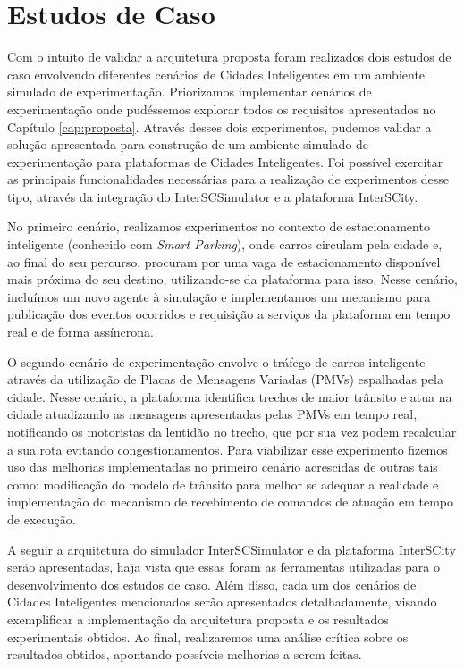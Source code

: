 \chapter{Estudos de Caso}
\label{cap:estudos-de-caso}


Com o intuito de validar a arquitetura proposta foram realizados dois estudos de caso envolvendo diferentes cenários de Cidades Inteligentes em um ambiente simulado de experimentação.
Priorizamos implementar cenários de experimentação onde pudéssemos explorar todos os requisitos apresentados no Capítulo \ref{cap:proposta}.
Através desses dois experimentos, pudemos validar a solução apresentada para construção de um ambiente simulado de experimentação para plataformas de Cidades Inteligentes.
Foi possível exercitar as principais funcionalidades necessárias para a realização de experimentos desse tipo, através da integração do InterSCSimulator e a plataforma InterSCity.

No primeiro cenário, realizamos experimentos no contexto de estacionamento inteligente (conhecido com \textit{Smart Parking}), onde carros circulam pela cidade e, ao
final do seu percurso, procuram por uma vaga de estacionamento disponível mais próxima do seu destino, utilizando-se da plataforma para isso.
Nesse cenário, incluímos um novo agente à simulação e implementamos um mecanismo para publicação dos eventos ocorridos e requisição a serviços da plataforma em tempo real
e de forma assíncrona.

O segundo cenário de experimentação envolve o tráfego de carros inteligente através da utilização de Placas de Mensagens Variadas (PMVs) espalhadas pela cidade.
Nesse cenário, a plataforma identifica trechos de maior trânsito e atua na cidade atualizando as mensagens apresentadas pelas PMVs em tempo real, notificando os
motoristas da lentidão no trecho, que por sua vez podem recalcular a sua rota evitando congestionamentos.
Para viabilizar esse experimento fizemos uso das melhorias implementadas no primeiro cenário acrescidas de outras tais como: modificação do modelo de trânsito para melhor se adequar a realidade e
implementação do mecanismo de recebimento de comandos de atuação em tempo de execução.

A seguir a arquitetura do simulador InterSCSimulator e da plataforma InterSCity serão apresentadas, haja vista que essas foram as ferramentas utilizadas para o desenvolvimento
dos estudos de caso.
Além disso, cada um dos cenários de Cidades Inteligentes mencionados serão apresentados detalhadamente, visando exemplificar a implementação da arquitetura proposta e os resultados experimentais obtidos.
Ao final, realizaremos uma análise crítica sobre os resultados obtidos, apontando possíveis melhorias a serem feitas.

